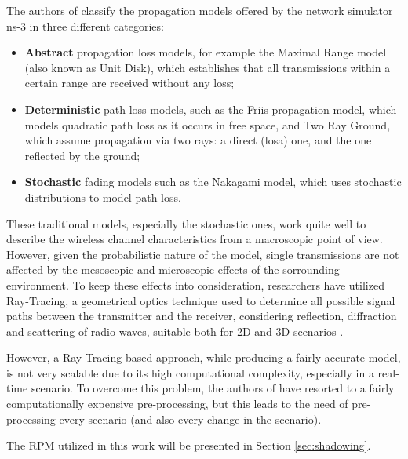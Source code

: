 			
			The authors of \cite{6298165} classify the propagation models offered by the network simulator ns-3 in three different categories:
			\begin{itemize}
				\item \textbf{Abstract} propagation loss models, for example the Maximal Range model (also known as Unit Disk), which establishes that all transmissions within a certain range are received without any loss;
				\item \textbf{Deterministic} path loss models, such as the Friis propagation model, which models quadratic path loss as it occurs in free space, and Two Ray Ground, which assume propagation via two rays: a direct (\acrshort{losa}) one, and the one reflected by the ground;
				\item \textbf{Stochastic} fading models such as the Nakagami model, which uses stochastic distributions to model path loss.
			\end{itemize}
		
		
			These traditional models, especially the stochastic ones, work quite well to describe the wireless channel characteristics from a macroscopic point of view. However, given the probabilistic nature of the model, single transmissions are not affected by the mesoscopic and microscopic effects of the sorrounding environment. To keep these effects into consideration, researchers have utilized Ray-Tracing, a geometrical optics technique used to determine all possible signal paths between the transmitter and the receiver, considering reflection, diffraction and scattering of radio waves, suitable both for 2D and 3D scenarios \cite{245274} \cite{765022}.
			
			
			However, a Ray-Tracing based approach, while producing a fairly accurate model, is not very scalable due to its high computational complexity, especially in a real-time scenario. To overcome this problem, the authors of \cite{STEPANOV200861} have resorted to a fairly computationally expensive pre-processing, but this leads to the need of pre-processing every scenario (and also every change in the scenario).
			
			
			The RPM utilized in this work will be presented in Section \ref{sec:shadowing}.
		
			
		
